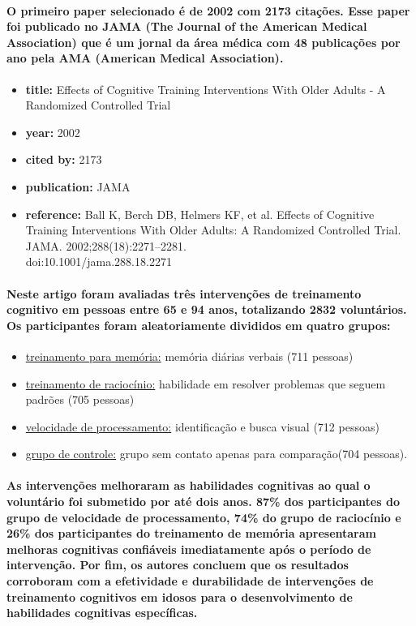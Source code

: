 \documentclass[a4paper]{article}    %
\begin{document}
\paragraph{O primeiro paper selecionado é de 2002 com 2173 citações. Esse paper foi publicado no JAMA (The Journal of the American Medical Association) que é um jornal da área médica com 48 publicações por ano pela AMA (American Medical Association).}
\begin{itemize}
    \item \textbf{title:} Effects of Cognitive Training Interventions With Older Adults - A Randomized Controlled Trial
    \item \textbf{year:} 2002
    \item \textbf{cited by:} 2173
    \item \textbf{publication:} JAMA
    \item \textbf{reference:} Ball K, Berch DB, Helmers KF, et al. Effects of Cognitive Training Interventions With Older Adults: A Randomized Controlled Trial. JAMA. 2002;288(18):2271–2281.\\ doi:10.1001/jama.288.18.2271
\end{itemize}

\paragraph{Neste artigo foram avaliadas três intervenções de treinamento cognitivo em pessoas entre 65 e 94 anos, totalizando 2832 voluntários. Os participantes foram aleatoriamente divididos em quatro grupos:}
\begin{itemize}
    \item \underline{treinamento para memória:} memória diárias verbais (711 pessoas)
    \item \underline{treinamento de raciocínio:} habilidade em resolver problemas que seguem padrões (705 pessoas)
    \item \underline{velocidade de processamento:} identificação e busca visual (712 pessoas)
    \item \underline{grupo de controle:} grupo sem contato apenas para comparação(704 pessoas).
\end{itemize}

\paragraph{As intervenções melhoraram as habilidades cognitivas ao qual o voluntário foi submetido por até dois anos. 87\% dos participantes do grupo de velocidade de processamento, 74\% do grupo de raciocínio e 26\% dos participantes do treinamento de memória apresentaram melhoras cognitivas confiáveis imediatamente após o período de intervenção. Por fim, os autores concluem que os resultados corroboram com a efetividade e durabilidade de intervenções de treinamento cognitivos em idosos para o desenvolvimento de habilidades cognitivas específicas.}
\end{document}
